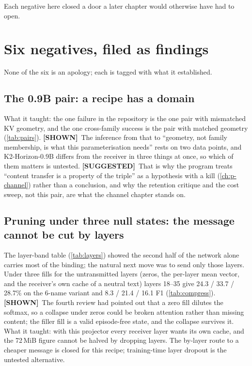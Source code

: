 \documentclass[11pt,a4paper]{report}
\newcommand{\SHOWN}{\textcolor{shownc}{\textbf{\scriptsize[SHOWN]}}}
\newcommand{\SUGG}{\textcolor{suggc}{\textbf{\scriptsize[SUGGESTED]}}}
\begin{document}
\noindent Each negative here closed a door a later chapter would otherwise have had to open.

\chapter{Six negatives, filed as findings}
\label{ch:failed}

None of the six is an apology; each is tagged with what it established.

\section{The 0.9B pair: a recipe has a domain}

What it taught: the one failure in the repository is the one pair with mismatched KV geometry, and the one cross-family success is the pair with matched geometry (\cref{tab:pairs}). \SHOWN\ The inference from that to ``geometry, not family membership, is what this parameterisation needs'' rests on two data points, and K2-Horizon-0.9B differs from the receiver in three things at once, so which of them matters is untested. \SUGG\ That is why the program treats ``content transfer is a property of the triple'' as a hypothesis with a kill (\cref{ch:p-channel}) rather than a conclusion, and why the retention critique and the cost sweep, not this pair, are what the channel chapter stands on.

\section{Pruning under three null states: the message cannot be cut by layers}

The layer-band table (\cref{tab:layers}) showed the second half of the network alone carries most of the binding; the natural next move was to send only those layers. Under three fills for the untransmitted layers (zeros, the per-layer mean vector, and the receiver's own cache of a neutral text) layers 18--35 give 24.3 / 33.7 / 28.7\% on the 6-name variant and 8.3 / 21.4 / 16.1 F1 (\cref{tab:compress}). \SHOWN\ The fourth review had pointed out that a zero fill dilutes the softmax, so a collapse under zeros could be broken attention rather than missing content; the filler fill is a valid episode-free state, and the collapse survives it. What it taught: with this projector every receiver layer wants its own cache, and the 72\,MiB figure cannot be halved by dropping layers. The by-layer route to a cheaper message is closed for this recipe; training-time layer dropout is the untested alternative.
\end{document}
